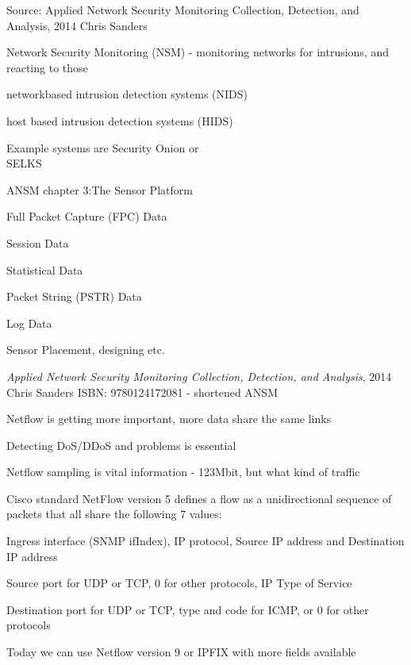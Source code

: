 \documentclass[Screen16to9,17pt]{foils}
\begin{document}
Source: Applied Network Security Monitoring Collection, Detection, and Analysis, 2014 Chris Sanders


\begin{list2}
\item Network Security Monitoring (NSM) - monitoring networks for intrusions, and reacting to those
\item networkbased intrusion detection systems (NIDS)
\item host based intrusion detection systems (HIDS)
\item Example systems are Security Onion  or\\ SELKS 
\end{list2}





\begin{list1}
\item ANSM chapter 3:The Sensor Platform
\begin{list2}
\item Full Packet Capture (FPC) Data
\item Session Data
\item Statistical Data
\item Packet String (PSTR) Data
\item Log Data
\item Sensor Placement, designing etc.
\end{list2}
\end{list1}
\emph{Applied Network Security Monitoring Collection, Detection, and Analysis}, 2014 Chris Sanders ISBN: 9780124172081 - shortened ANSM



\begin{list1}
\item Netflow is getting more important, more data share the same links
\item Detecting DoS/DDoS and problems is essential
\item Netflow sampling is vital information - 123Mbit, but what kind of traffic
\item Cisco standard NetFlow version 5 defines a flow as a unidirectional sequence of packets that all share the following 7 values:
\begin{list2}
\item Ingress interface (SNMP ifIndex), IP protocol, Source IP address and Destination IP address
\item Source port for UDP or TCP, 0 for other protocols, IP Type of Service
\item Destination port for UDP or TCP, type and code for ICMP, or 0 for other protocols
\end{list2}
\item Today we can use Netflow version 9 or IPFIX with more fields available
\end{list1}
\end{document}
